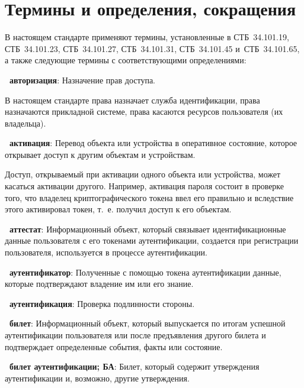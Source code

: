 \chapter{Термины и определения, сокращения}\label{TERMS}

В настоящем стандарте применяют термины, установленные в СТБ~34.101.19, 
СТБ~34.101.23, СТБ~34.101.27, СТБ~34.101.31, СТБ~34.101.45 и~СТБ~34.101.65, 
а также следующие термины с соответствующими определениями:

{\bf \thedefctr~авторизация}:
Назначение прав доступа.

\begin{note*}
В настоящем стандарте права назначает служба идентификации,
права назначаются прикладной системе, права касаются ресурсов пользователя
(их владельца).
\end{note*}

{\bf \thedefctr~активация}:
Перевод объекта или устройства в оперативное состояние,
которое открывает доступ к другим объектам и устройствам. 

\begin{note*}
Доступ, открываемый при активации одного объекта или устройства,
может касаться активации другого.
%
Например, активация пароля состоит в проверке того, что 
владелец криптографического токена ввел его правильно 
и вследствие этого активировал токен, т.~е. получил доступ к его объектам.  
\end{note*}

{\bf \thedefctr~аттестат}:
Информационный объект, который связывает идентификационные 
данные пользователя с его токенами аутентификации,
создается при регистрации пользователя,
используется в процессе аутентификации.

{\bf \thedefctr~аутентификатор}:
Полученные с помощью токена аутентификации данные, 
которые подтверждают владение им или его знание. 

{\bf \thedefctr~аутентификация}:
Проверка подлинности стороны.


{\bf \thedefctr~билет}:
Информационный объект, который выпускается по итогам успешной аутентификации
пользователя или после предъявления другого билета и подтверждает определенные  
события, факты или состояние. 


{\bf \thedefctr~билет аутентификации; БА}:
Билет, который содержит утверждения аутентификации и, возможно, другие
утверждения.

